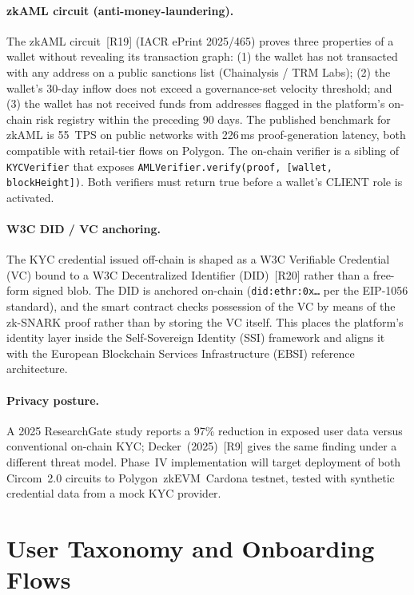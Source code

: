 \documentclass[12pt,a4paper]{report}
\begin{document}
\paragraph{zkAML circuit (anti-money-laundering).}
The zkAML circuit~[R19] (IACR ePrint 2025/465) proves three properties of a wallet without revealing its transaction graph: (1) the wallet has not transacted with any address on a public sanctions list (Chainalysis / TRM Labs); (2) the wallet's 30-day inflow does not exceed a governance-set velocity threshold; and (3) the wallet has not received funds from addresses flagged in the platform's on-chain risk registry within the preceding 90 days. The published benchmark for zkAML is 55~TPS on public networks with 226\,ms proof-generation latency, both compatible with retail-tier flows on Polygon. The on-chain verifier is a sibling of \texttt{KYCVerifier} that exposes \texttt{AMLVerifier.verify(proof, [wallet, blockHeight])}. Both verifiers must return true before a wallet's CLIENT role is activated.

\paragraph{W3C DID / VC anchoring.}
The KYC credential issued off-chain is shaped as a W3C Verifiable Credential (VC) bound to a W3C Decentralized Identifier (DID)~[R20] rather than a free-form signed blob. The DID is anchored on-chain (\texttt{did:ethr:0x\ldots} per the EIP-1056 standard), and the smart contract checks possession of the VC by means of the zk-SNARK proof rather than by storing the VC itself. This places the platform's identity layer inside the Self-Sovereign Identity (SSI) framework and aligns it with the European Blockchain Services Infrastructure (EBSI) reference architecture.

\paragraph{Privacy posture.}
A 2025 ResearchGate study reports a 97\% reduction in exposed user data versus conventional on-chain KYC; Decker~(2025)~[R9] gives the same finding under a different threat model. Phase~IV implementation will target deployment of both Circom~2.0 circuits to Polygon~zkEVM~Cardona testnet, tested with synthetic credential data from a mock KYC provider.

\section{User Taxonomy and Onboarding Flows}
\label{sec:onboarding}
\end{document}
